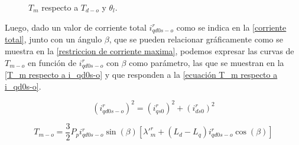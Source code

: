 \documentclass[a4paper, 10pt, onecolumn,journal]{ieeeconf}
\begin{document}
\begin{figure}[H]
    \centering
    \begin{adjustbox}{scale = 0.6}
    \end{adjustbox}
    \caption{$T_m$ respecto a $T_{d-o}$ y $\theta_l$.}
    \label{T_m en función de la posición y T_do}
\end{figure}

Luego, dado un valor de corriente total $i^{r}_{qd0s-o}$ como se indica en la \cref{corriente total}, junto con un
ángulo $\beta$, que se pueden relacionar
gráficamente como se muestra en la \cref{restriccion de corriente maxima}, podemos expresar
las curvas de $T_{m-o}$ en función de $i^{r}_{qd0s-o}$ con $\beta$ como parámetro, las que
se muestran en la \cref{T_m respecto a i_qd0s-o} y que responden a la \cref{ecuación T_m respecto a i_qd0s-o}.


\begin{equation}
    \left(i^{r}_{qd0s-o}\right)^2 = \left(i^{r}_{qs0}\right)^2 + \left(i^{r}_{ds0}\right)^2
    \label{corriente total}
\end{equation}

\begin{equation}
    T_{m-o} = \frac{3}{2} P_p i^r_{qd0s-o}\sin(\beta)\left[\lambda'^r_m + (L_d - L_q) i^r_{qd0s-o}\cos(\beta)\right]
    \label{ecuación T_m respecto a i_qd0s-o}
\end{equation}
\end{document}

